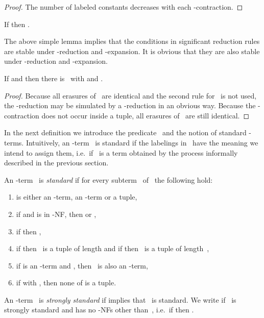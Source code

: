 \documentclass[a4paper,UKenglish]{lipics-v2016}
\begin{document}
\begin{proof}
  The number of labeled constants decreases with each
  -contraction.
\end{proof}

\begin{lemma}
  If  then .
\end{lemma}

The above simple lemma implies that the conditions in significant
reduction rules are stable under -reduction and -expansion. It
is obvious that they are also stable under -reduction and
-expansion.

\begin{lemma}\label{lem_s_minus_erase}
  If  and  then there is~ with
   and .
\end{lemma}

\begin{proof}
  Because all erasures of~ are identical and the second rule
  for~ is not used, the -reduction may be simulated by a
  -reduction in an obvious way. Because the -contraction
  does not occur inside a tuple, all erasures of~ are still
  identical.
\end{proof}

In the next definition we introduce the predicate~ and
the notion of standard -terms. Intuitively, an -term~ is
standard if the labelings in~ have the meaning we intend to assign
them, i.e.~if~ is a term obtained by the process informally
described in the previous section.

\begin{definition}\label{def_standard}
  An -term~ is \emph{standard} if for every subterm~ of~
  the following hold:
  \begin{enumerate}
  \item\label{std_i_or_s_or_tuple}  is either an -term, an
    -term or a tuple,
  \item\label{std_c_1} if  and  is in
    -NF, then  or ,
  \item\label{std_c_2} if  then
    ,
  \item\label{std_s} if 
    then~ is a tuple of length  and if 
    then~ is a tuple of length~,
  \item\label{std_s_term_reduce} if  is an -term and
    , then~ is also an -term,
  \item\label{std_no_nested_tuple} if
     with , then none of
     is a tuple.
  \end{enumerate}
  An -term~ is \emph{strongly standard} if 
  implies that~ is standard. We write  if~ is
  strongly standard and has no -NFs other than~, i.e.~if
   then .
\end{definition}
\end{document}
